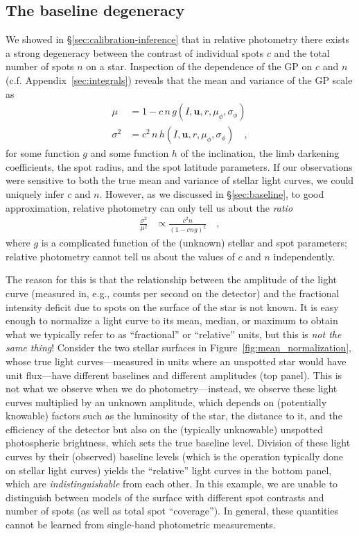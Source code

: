 \documentclass[modern]{aastex62}
\begin{document}
\subsection{The baseline degeneracy}
\label{sec:breaking_baseline_degeneracy}

We showed in \S\ref{sec:calibration-inference} that in relative photometry there exists a
strong degeneracy between the contrast of individual spots $c$ and
the total number of spots $n$ on a star. Inspection of the
dependence of the GP on $c$ and $n$ (c.f. Appendix~\ref{sec:integrals}) reveals
that the mean and variance of the GP scale as
%
\begin{align}
    \mu      & = 1 - c \, n \, g (I, \mathbf{u}, r, \mu_\phi, \sigma_\phi)
    \nonumber                                                              \\
    \sigma^2 & = c^2 \, n \, h (I, \mathbf{u}, r, \mu_\phi, \sigma_\phi)
    \quad,
\end{align}
%
for some function $g$ and some function $h$ of the inclination,
the limb darkening coefficients, the spot radius, and the spot latitude
parameters.
If our observations were sensitive to both the true mean and
variance of stellar light curves,
we could uniquely infer $c$ and $n$. However, as we discussed in \S\ref{sec:baseline},
to good approximation, relative photometry can only tell us about the \emph{ratio}
%
\begin{align}
    \frac{\sigma^2}{\mu^2}
     & \propto \frac{c^2 n}{(1 - c n g)^2}
    \quad,
\end{align}
%
where $g$ is a complicated function of the (unknown) stellar and spot parameters;
relative photometry cannot tell us about the values of $c$ and $n$ independently.

The reason for this is that the relationship between the amplitude of the
light curve (measured in, e.g., counts per second on the detector)
and the fractional intensity deficit due to spots on the surface of
the star is not known. It is easy enough to normalize a light curve to its
mean, median, or maximum to obtain what we typically refer to as
``fractional'' or ``relative'' units, but this is \emph{not the same
    thing}! Consider the two stellar surfaces in Figure~\ref{fig:mean_normalization},
whose true light curves---measured in units where an unspotted star would
have unit flux---have different baselines and different amplitudes (top panel).
This is not what we observe when we do photometry---instead, we observe these
light curves multiplied by an unknown amplitude, which depends on (potentially
knowable) factors such as the luminosity of the star, the distance to it,
and the efficiency of the detector but also on the (typically unknowable)
unspotted photospheric brightness, which sets the true baseline level.
%
Division of these light curves by their (observed) baseline levels
(which is the operation typically done on stellar light curves) yields the
``relative'' light curves in the bottom panel, which are \emph{indistinguishable}
from each other. In this example, we are unable to distinguish between
models of the surface with different spot contrasts and number of spots (as well
as total spot ``coverage''). In general, these quantities cannot be learned
from single-band photometric measurements.
%
\end{document}
